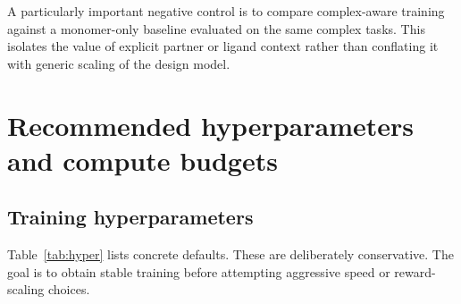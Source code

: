 \documentclass[11pt]{article}
\begin{document}
	A particularly important negative control is to compare complex-aware training against a monomer-only baseline evaluated on the same complex tasks. This isolates the value of explicit partner or ligand context rather than conflating it with generic scaling of the design model.
	
	
	\section{Recommended hyperparameters and compute budgets}
	\label{sec:hyper}
	
	\subsection{Training hyperparameters}
	
	Table~\ref{tab:hyper} lists concrete defaults. These are deliberately conservative. The goal is to obtain stable training before attempting aggressive speed or reward-scaling choices.
	
\end{document}
